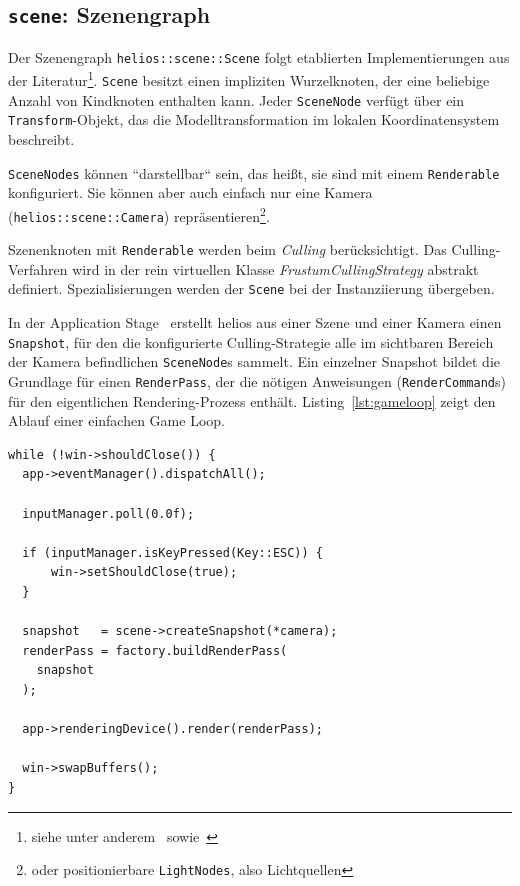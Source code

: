 \subsection*{\texttt{scene}: Szenengraph}
Der Szenengraph \texttt{helios::scene::Scene} folgt etablierten Implementierungen aus der Literatur\footnote{siehe unter anderem~\cite[]{She07} sowie~\cite[]{Gre19}}.
\texttt{Scene} besitzt einen impliziten Wurzelknoten, der eine beliebige Anzahl von Kindknoten enthalten kann.
Jeder \texttt{SceneNode} verfügt über ein \texttt{Transform}-Objekt, das die Modelltransformation im lokalen Koordinatensystem beschreibt.\par
\texttt{SceneNodes} können ``darstellbar`` sein, das heißt, sie sind mit einem \texttt{Renderable} konfiguriert.
Sie können aber auch einfach nur eine Kamera (\texttt{helios::scene::Camera}) repräsentieren\footnote{oder positionierbare \texttt{LightNodes}, also Lichtquellen}.\par
Szenenknoten mit \texttt{Renderable} werden beim \textit{Culling} berücksichtigt.
Das Culling-Verfahren wird in der rein virtuellen Klasse \textit{FrustumCullingStrategy} abstrakt definiert. Spezialisierungen werden der \texttt{Scene} bei der Instanziierung übergeben.\par
In der Application Stage~\cite[687]{Gre19} erstellt helios aus einer Szene und einer Kamera einen \texttt{Snapshot}, für den die konfigurierte Culling-Strategie alle im sichtbaren Bereich der Kamera befindlichen \texttt{SceneNode}s sammelt.
Ein einzelner Snapshot bildet die Grundlage für einen \texttt{RenderPass}, der die nötigen Anweisungen (\texttt{RenderCommand}s) für den eigentlichen Rendering-Prozess enthält.
Listing~\ref{lst:gameloop} zeigt den Ablauf einer einfachen Game Loop.

\vspace{4mm}
\begin{lstlisting}[style=c++style, caption={Implementierung einer einfachen Game Loop in helios. Von der Szene wird ein \texttt{Snapshot} erstellt, der als Grundlage für den \texttt{RenderPass} dient.}, label=lst:gameloop]
while (!win->shouldClose()) {
  app->eventManager().dispatchAll();

  inputManager.poll(0.0f);

  if (inputManager.isKeyPressed(Key::ESC)) {
      win->setShouldClose(true);
  }

  snapshot   = scene->createSnapshot(*camera);
  renderPass = factory.buildRenderPass(
    snapshot
  );

  app->renderingDevice().render(renderPass);

  win->swapBuffers();
}
\end{lstlisting}
\vspace{4mm}


